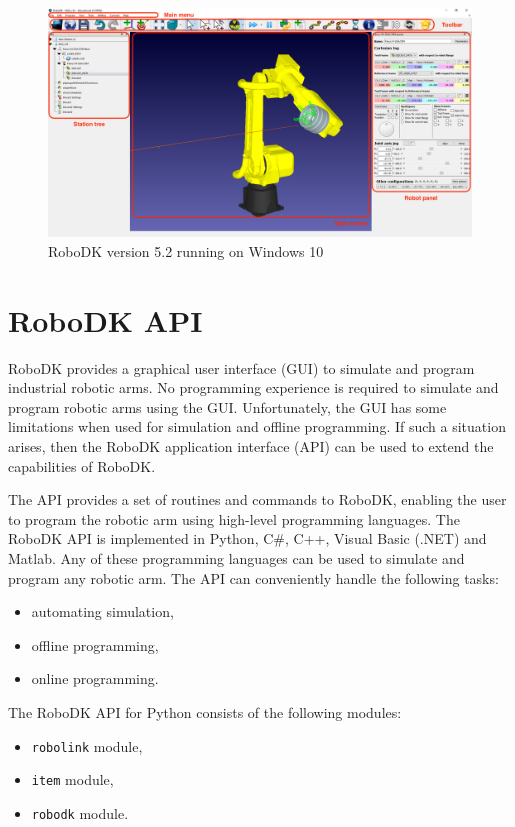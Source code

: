 \begin{figure}[h]
    \centering
    \includegraphics[width=0.9\linewidth]{img/robodk_interface_v_2.png}
    \caption{RoboDK version 5.2 running on Windows 10}
    \label{fig:robodkinterface}
\end{figure}

\section{RoboDK API}

RoboDK provides a graphical user interface (GUI) to simulate and program industrial robotic arms. No programming experience is required to simulate and program robotic arms using the GUI. Unfortunately, the GUI has some limitations when used for simulation and offline programming. If such a situation arises, then the RoboDK application interface (API) can be used to extend the capabilities of RoboDK.

The API provides a set of routines and commands to RoboDK, enabling the user to program the robotic arm using high-level programming languages. The RoboDK API is implemented in Python, C\#, C++, Visual Basic (.NET) and Matlab. Any of these programming languages can be used to simulate and program any robotic arm. The API can conveniently handle the following tasks:

\begin{itemize}
    \item automating simulation,
    \item offline programming,
    \item online programming.

\end{itemize}

The RoboDK API for Python consists of the following modules:


\begin{itemize}
    \item \texttt{robolink} module, 
    \item \texttt{item} module, 
    \item \texttt{robodk} module.
\end{itemize}

